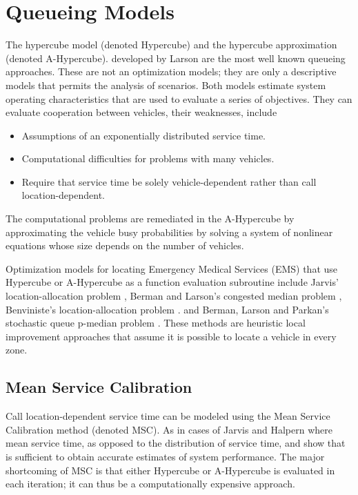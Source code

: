 \section{Queueing Models}
The hypercube model (denoted Hypercube)
and the hypercube approximation (denoted A-Hypercube).
developed by Larson  \cite{larson1974hypercube,larson1975approximating}
are the most well known queueing approaches.
These are not an optimization models;
they are only a descriptive models
that permits the analysis of scenarios.
Both models
estimate system operating characteristics
that are used to evaluate a series of objectives.
They can evaluate cooperation between vehicles,
their weaknesses, include
\begin{itemize}
\item Assumptions of an exponentially distributed service time.
\item Computational difficulties for problems with many vehicles.
\item Require that service time be solely vehicle-dependent
  rather than call location-dependent.
\end{itemize}

The computational problems are remediated in the A-Hypercube
by approximating the vehicle busy probabilities
by solving a system of nonlinear equations
whose size depends on the number of vehicles.

Optimization models for locating Emergency Medical Services (EMS)
that use Hypercube or A-Hypercube as a function evaluation subroutine
include Jarvis' location-allocation problem \cite{jarvis1975optimization},
Berman and Larson's congested median problem \cite{berman1982median},
Benviniste's location-allocation problem \cite{benveniste1985solving}.
and Berman, Larson and Parkan's
stochastic queue p-median problem \cite{berman1987stochastic}.
These methods are heuristic local improvement approaches
that assume it is possible to locate a vehicle in every zone.

\subsection{Mean Service Calibration}
Call location-dependent service time
can be modeled using the Mean Service Calibration method (denoted MSC).
As in cases of
Jarvis \cite{jarvis1975optimization} 
and Halpern \cite{halpern1977accuracy}
where mean service time,
as opposed to the distribution of service time,
and show that
is sufficient to obtain accurate estimates of system performance.
The major shortcoming of MSC is that either
Hypercube or A-Hypercube
is evaluated in each iteration;
it can thus be a computationally expensive approach.

